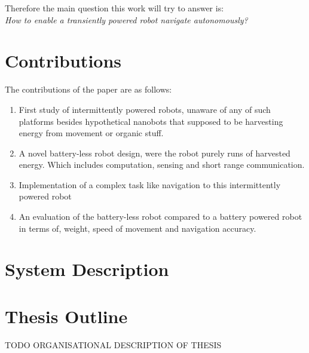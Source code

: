 Therefore the main question this work will try to answer is: \\
\textit{How to enable a transiently powered robot navigate autonomously?}

\section{Contributions}

The contributions of the paper are as follows:

\begin{enumerate}

\item First study of intermittently powered robots, unaware of any of such platforms besides hypothetical nanobots that supposed to be harvesting energy from movement or organic stuff.

\item A novel battery-less robot design, were the robot purely runs of harvested energy. Which includes computation, sensing and short range communication.

\item Implementation of a complex task like navigation to this intermittently powered robot

\item An evaluation of the battery-less robot compared to a battery powered robot in terms of, weight, speed of movement and navigation accuracy.
\end{enumerate}

\section{System Description}


\section{Thesis Outline}


\vspace{1\baselineskip}

\noindent
TODO ORGANISATIONAL DESCRIPTION OF THESIS


